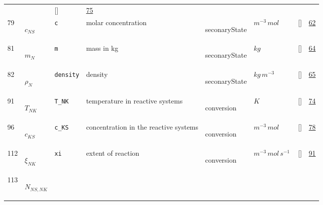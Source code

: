 \begin{longtable}{|p{1cm}|p{3cm}|p{3cm}|p{7cm}|p{3.0cm}|p{3cm}|p{2cm}|p{1cm}|}
             & $  $
             & []
             & \hyperlink{"e:75"}{ 75 }
                 \\
    79
             & \hypertarget{"v:79"}{ $ {c}_{{N S}} $}
             & \verb|c|
             & molar concentration
             & \begin{lay}seconaryState \end{lay}
             & $ m^{-3} \,mol \, $
             & []
             & \hyperlink{"e:62"}{ 62 }
                 \\
    81
             & \hypertarget{"v:81"}{ $ {m}_{N} $}
             & \verb|m|
             & mass in kg
             & \begin{lay}seconaryState \end{lay}
             & $ kg \, $
             & []
             & \hyperlink{"e:64"}{ 64 }
                 \\
    82
             & \hypertarget{"v:82"}{ $ {\rho}_{N} $}
             & \verb|density|
             & density
             & \begin{lay}seconaryState \end{lay}
             & $ kg \,m^{-3} \, $
             & []
             & \hyperlink{"e:65"}{ 65 }
                 \\
    91
             & \hypertarget{"v:91"}{ $ {T}_{{N K}} $}
             & \verb|T_NK|
             & temperature in reactive systems
             & \begin{lay}conversion \end{lay}
             & $ K \, $
             & []
             & \hyperlink{"e:74"}{ 74 }
                 \\
    96
             & \hypertarget{"v:96"}{ $ {c}_{{K S}} $}
             & \verb|c_KS|
             & concentration in the reactive systems
             & \begin{lay}conversion \end{lay}
             & $ m^{-3} \,mol \, $
             & []
             & \hyperlink{"e:78"}{ 78 }
                 \\
    112
             & \hypertarget{"v:112"}{ $ {\xi}_{{N K}} $}
             & \verb|xi|
             & extent of reaction
             & \begin{lay}conversion \end{lay}
             & $ m^{-3} \,mol \,s^{-1} \, $
             & []
             & \hyperlink{"e:91"}{ 91 }
                 \\
    113
             & \hypertarget{"v:113"}{ $ {N}_{{N S}, {N K}} $}

\end{longtable}
